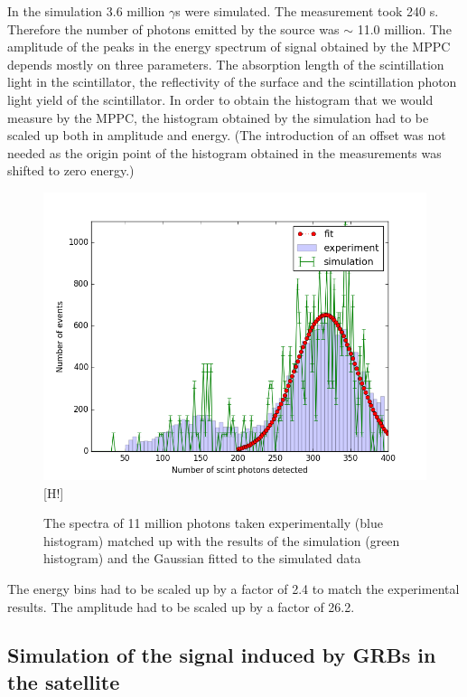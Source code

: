 \documentclass[12pt, a4paper,titlepage]{article}
\numberwithin{equation}{section}
\numberwithin{figure}{section}
\begin{document}
In the simulation 3.6 million $\gamma$s were simulated. The measurement took 240 s. Therefore the number of photons emitted by the source was $\sim$ 11.0 million. The amplitude of the peaks in the energy spectrum of signal obtained by the MPPC depends mostly on three parameters. The absorption length of the scintillation light in the scintillator, the reflectivity of the surface and the scintillation photon light yield of the scintillator. In order to obtain the histogram that we would measure by the MPPC, the histogram obtained by the simulation had to be scaled up both in amplitude and energy. (The introduction of an offset was not needed as the origin point of the histogram obtained in the measurements was shifted to zero energy.)

\begin{figure}[h!]
\includegraphics[width=150.0mm]{images/calibration_photon_yield.png}[H!]
\caption{The spectra of 11 million photons taken experimentally \cite{kento} (blue histogram) matched up with the results of the simulation (green histogram) and the Gaussian fitted to the simulated data}
\label{fig:sim_res_calib}
\end{figure}

The energy bins had to be scaled up by a factor of 2.4 to match the experimental results. The amplitude had to be scaled up by a factor of 26.2.

\pagebreak

\subsection{Simulation of the signal induced by GRBs in the satellite} \label{sec:grb}
\end{document}
